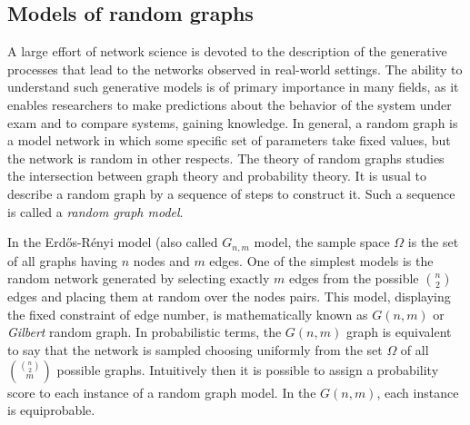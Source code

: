 
\subsection{Models of random graphs}\label{sec:models_random_graph}
A large effort of network science is devoted to the description of the generative processes that lead to the networks observed in real-world settings.
The ability to understand such generative models is of primary importance in many fields, as it enables researchers to make predictions about the behavior of the system under exam and to compare systems, gaining knowledge.
In general, a random graph is a model network in which some specific set of parameters take fixed values, but the network is random in other respects.
The theory of random graphs studies the intersection between graph theory and probability theory.
It is usual to describe a random graph by a sequence of steps to construct it.
Such a sequence is called a \emph{random graph model}.

In the Erd\H{o}s-Rényi model (also called $G_{n,m}$ model, the sample space $\Omega$ is the set of all graphs having $n$ nodes and $m$ edges.
One of the simplest models is the random network generated by selecting exactly $m$ edges from the possible $\binom{n}{2}$ edges and placing them at random over the nodes pairs.
This model, displaying the fixed constraint of edge number, is mathematically known as $G(n,m)$ or \emph{Gilbert} random graph.
In probabilistic terms, the $G(n,m)$ graph is equivalent to say that the network is sampled choosing uniformly from the set $\Omega$ of all $\binom{\binom{n}{2}}{m}$ possible graphs.
Intuitively then it is possible to assign a probability score to each instance of a random graph model.
In the $G(n,m)$, each instance is equiprobable.

